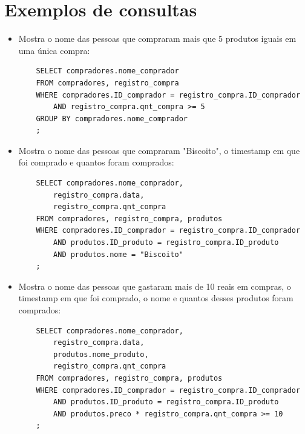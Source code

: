 \documentclass{article}
\begin{document}
\newpage
\section*{Exemplos de consultas}

\begin{itemize}
    \item Mostra o nome das pessoas que compraram mais que
        5 produtos iguais em uma única compra:
        \begin{verbatim}
    SELECT compradores.nome_comprador
    FROM compradores, registro_compra
    WHERE compradores.ID_comprador = registro_compra.ID_comprador
        AND registro_compra.qnt_compra >= 5
    GROUP BY compradores.nome_comprador
    ;
        \end{verbatim}
    \item Mostra o nome das pessoas que compraram "Biscoito",
        o timestamp em que foi comprado e
        quantos foram comprados:
        \begin{verbatim}
    SELECT compradores.nome_comprador,
        registro_compra.data,
        registro_compra.qnt_compra
    FROM compradores, registro_compra, produtos
    WHERE compradores.ID_comprador = registro_compra.ID_comprador
        AND produtos.ID_produto = registro_compra.ID_produto
        AND produtos.nome = "Biscoito"
    ;
        \end{verbatim}
    \item Mostra o nome das pessoas que gastaram mais de 10 reais em compras,
        o timestamp em que foi comprado,
        o nome e
        quantos desses produtos foram comprados:
        \begin{verbatim}
    SELECT compradores.nome_comprador,
        registro_compra.data,
        produtos.nome_produto,
        registro_compra.qnt_compra
    FROM compradores, registro_compra, produtos
    WHERE compradores.ID_comprador = registro_compra.ID_comprador
        AND produtos.ID_produto = registro_compra.ID_produto
        AND produtos.preco * registro_compra.qnt_compra >= 10
    ;
        \end{verbatim}
\end{itemize}
\end{document}
